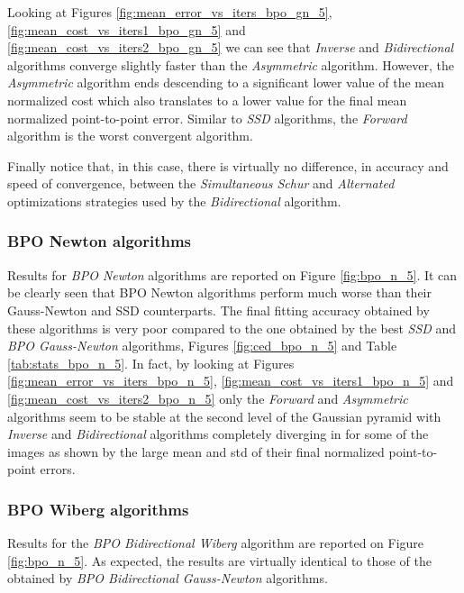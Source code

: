 Looking at Figures \ref{fig:mean_error_vs_iters_bpo_gn_5}, \ref{fig:mean_cost_vs_iters1_bpo_gn_5} and \ref{fig:mean_cost_vs_iters2_bpo_gn_5} we can see that \emph{Inverse} and \emph{Bidirectional} algorithms converge slightly faster than the \emph{Asymmetric} algorithm. However, the \emph{Asymmetric} algorithm ends descending to a significant lower value of the mean normalized cost which also translates to a lower value for the final mean normalized point-to-point error. Similar to \emph{SSD} algorithms, the \emph{Forward} algorithm  is the worst convergent algorithm.

Finally notice that, in this case, there is virtually no difference, in accuracy and speed of convergence, between the \emph{Simultaneous Schur} and \emph{Alternated} optimizations strategies used by the \emph{Bidirectional} algorithm.


\subsubsection{BPO Newton algorithms}

Results for \emph{BPO Newton} algorithms are reported on Figure \ref{fig:bpo_n_5}. It can be clearly seen that BPO Newton algorithms perform much worse than their Gauss-Newton and SSD counterparts. The final fitting accuracy obtained by these algorithms is very poor compared to the one obtained by the best \emph{SSD} and \emph{BPO Gauss-Newton} algorithms, Figures \ref{fig:ced_bpo_n_5} and Table \ref{tab:stats_bpo_n_5}. In fact, by looking at Figures \ref{fig:mean_error_vs_iters_bpo_n_5}, \ref{fig:mean_cost_vs_iters1_bpo_n_5} and \ref{fig:mean_cost_vs_iters2_bpo_n_5} only the \emph{Forward} and \emph{Asymmetric} algorithms seem to be stable at the second level of the Gaussian pyramid with \emph{Inverse} and \emph{Bidirectional} algorithms completely diverging in for some of the images as shown by the large mean and std of their final normalized point-to-point errors. 


\subsubsection{BPO Wiberg algorithms}

Results for the \emph{BPO Bidirectional Wiberg} algorithm are reported on Figure \ref{fig:bpo_n_5}. As expected, the results are virtually identical to those of the obtained by \emph{BPO Bidirectional Gauss-Newton} algorithms.  


